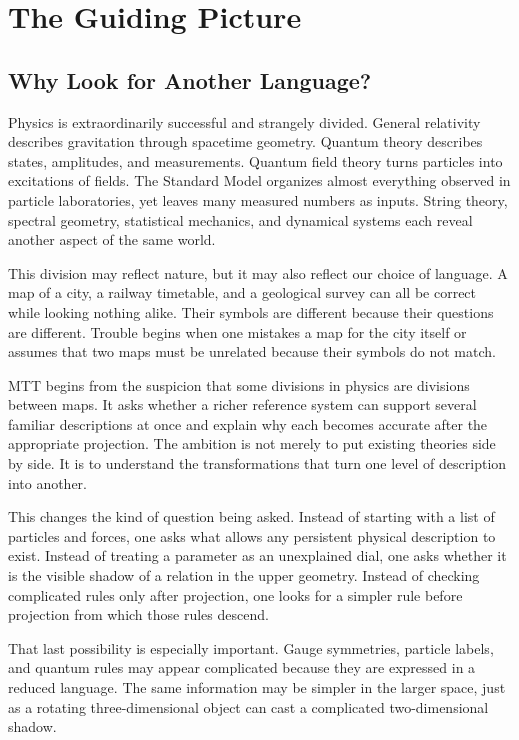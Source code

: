 \documentclass[11pt,openany]{book}
\begin{document}
\tableofcontents

\mainmatter

\part{The Guiding Picture}

\chapter{Why Look for Another Language?}

Physics is extraordinarily successful and strangely divided. General
relativity describes gravitation through spacetime geometry. Quantum theory
describes states, amplitudes, and measurements. Quantum field theory turns
particles into excitations of fields. The Standard Model organizes almost
everything observed in particle laboratories, yet leaves many measured
numbers as inputs. String theory, spectral geometry, statistical mechanics,
and dynamical systems each reveal another aspect of the same world.

This division may reflect nature, but it may also reflect our choice of
language. A map of a city, a railway timetable, and a geological survey can
all be correct while looking nothing alike. Their symbols are different
because their questions are different. Trouble begins when one mistakes a
map for the city itself or assumes that two maps must be unrelated because
their symbols do not match.

MTT begins from the suspicion that some divisions in physics are divisions
between maps. It asks whether a richer reference system can support several
familiar descriptions at once and explain why each becomes accurate after the
appropriate projection. The ambition is not merely to put existing theories
side by side. It is to understand the transformations that turn one level of
description into another.

This changes the kind of question being asked. Instead of starting with a
list of particles and forces, one asks what allows any persistent physical
description to exist. Instead of treating a parameter as an unexplained dial,
one asks whether it is the visible shadow of a relation in the upper
geometry. Instead of checking complicated rules only after projection, one
looks for a simpler rule before projection from which those rules descend.

That last possibility is especially important. Gauge symmetries, particle
labels, and quantum rules may appear complicated because they are expressed
in a reduced language. The same information may be simpler in the larger
space, just as a rotating three-dimensional object can cast a complicated
two-dimensional shadow.
\end{document}
